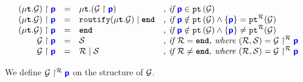 \documentclass{article}
\begin{document}
\doublespacing
\[
\begin{array}{>{\displaystyle}rc>{\displaystyle}l>{\displaystyle}l}
	\proj{(\tyrec{\newglobal})}{p} & = & \tyrec{(\proj{\newglobal}{p})} & \textit{, if }\role{p} \in \pt{\newglobal} \\
	\proj{(\tyrec{\newglobal})}{p} & = & \tyroutepar{\routify{\tyrec{\newglobal}}}{\tyend} & \textit{, if }\role{p} \notin \pt{\newglobal} \wedge \{\role{p}\} = \ptroute{\newglobal} \\
	\proj{(\tyrec{\newglobal})}{p} & = & \tyend & \textit{, if }\role{p} \notin \pt{\newglobal} \wedge \{\role{p}\} \neq \ptroute{\newglobal} \\
	\proj{\newglobal}{p} & = & \newlocal & \textit{, if } \newroute = \tyend \textit{, where } (\newroute, \newlocal) = \projroute{\newglobal}{p} \\
	\proj{\newglobal}{p} & = & \tyroutepar{\newroute}{\newlocal} & \textit{, if } \newroute \neq \tyend \textit{, where } (\newroute, \newlocal) = \projroute{\newglobal}{p} \\
\end{array}
\]
\singlespacing

We define ${\mathcal{G}} \upharpoonright^{\mathcal{R}} {\color{blue}\bm{\mathsf{p}}}$ on the structure of $\mathcal{G}$.
\end{document}
